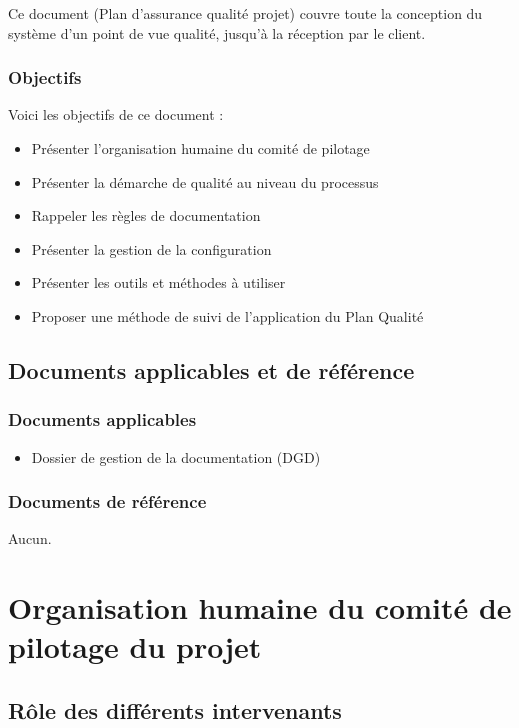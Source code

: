 Ce document (Plan d'assurance qualité projet) couvre toute la conception du système d'un point de vue qualité, jusqu'à la réception par le client.

\subsection{Objectifs}

Voici les objectifs de ce document :
\begin{itemize}
\item Présenter l'organisation humaine du comité de pilotage
\item Présenter la démarche de qualité au niveau du processus
\item Rappeler les règles de documentation
\item Présenter la gestion de la configuration
\item Présenter les outils et méthodes à utiliser
\item Proposer une méthode de suivi de l'application du Plan Qualité
\end{itemize}

\section{Documents applicables et de référence}

\subsection{Documents applicables}

\begin{itemize}
\item Dossier de gestion de la documentation (DGD)
\end{itemize}

\subsection{Documents de référence}

Aucun.

\chapter{Organisation humaine du comité de pilotage du projet}

\section{Rôle des différents intervenants}

